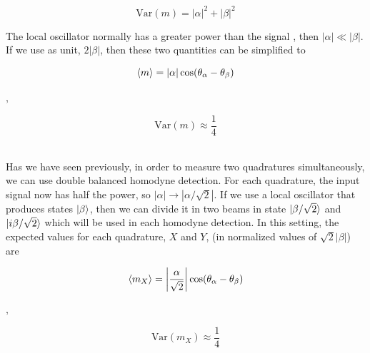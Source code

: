 \begin{bibunit}[plain]
\begin{center}
\begin{minipage}{46mm}
		\noindent
		\begin{equation}
			\textrm{Var}(m) = |\alpha|^2 + |\beta|^2
		\end{equation}
	\end{minipage}
\end{center}
%
The local oscillator normally has a greater power than the signal
, then $|\alpha| \ll |\beta|$. If we use as unit, $2|\beta|$, then these two quantities can be simplified to
%
\begin{center}
	\begin{minipage}{52mm}
		\noindent
		\begin{equation}
			\braket{m} = |\alpha|\cos({\theta_\alpha - \theta_\beta})
		\end{equation}
	\end{minipage}
	$,\quad$
	\begin{minipage}{34mm}
		\noindent
		\begin{equation}
			\textrm{Var}(m) \approx \frac{1}{4}
		\end{equation}
	\end{minipage}
\end{center}
%
\cite{hans2004}
\\
Has we have seen previously, in order to measure two quadratures simultaneously, we can use double balanced homodyne detection. For each quadrature, the input signal now has half the power, so $|\alpha| \rightarrow |\alpha/\sqrt{2}|$.  If we use a local oscillator that produces states $\ket{\beta}$, then we can divide it in two beams in state $\ket{\beta/\sqrt{2}}$ and $\ket{i\beta/\sqrt{2}}$ which will be used in each homodyne detection. In this setting, the expected values for each quadrature, $X$ and $Y$, (in normalized values of $\sqrt{2}|\beta|$) are
%
\begin{center}
	\begin{minipage}{58mm}
		\noindent
		\begin{equation}
			\braket{m_X} = \left|\frac{\alpha}{\sqrt{2}}\right| \cos({\theta_\alpha - \theta_\beta})
		\end{equation}
	\end{minipage}
	$,\quad$
	\begin{minipage}{37mm}
		\noindent
		\begin{equation}
			\textrm{Var}(m_X) \approx \frac{1}{4}
		\end{equation}
	\end{minipage}
\end{center}

\end{bibunit}
